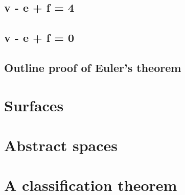 \documentclass{beamer}
\begin{document}
    \subsection{v - e + f = 4}
    \subsection{v - e + f = 0}
    \subsection{Outline proof of Euler's theorem}
\section{Surfaces}
\section{Abstract spaces}
\section{A classification theorem}
\end{document}
